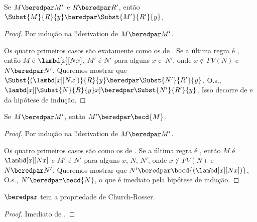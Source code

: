 \documentclass[../../../include/open-logic-section]{subfiles}
\begin{document}
\begin{lem}
  Se $M \beredpar M'$ e $R \beredpar R'$, então $\Subst{M}{R}{y}
  \beredpar \Subst{M'}{R'}{y}$.
\end{lem}

\begin{proof}
  Por indução na !!{derivation} de $M \beredpar M'$.

  Os quatro primeiros casos são exatamente como os de
  . Se a última regra é , então
  $M$ é $\lambd[x][Nx]$, $M'$ é $N'$ para alguns $x$ e~$N'$, onde
  $x \notin FV(N)$ e $N \beredpar N'$. Queremos mostrar que
  $\Subst{(\lambd[x][Nx])}{R}{y} \beredpar \Subst{N'}{R'}{y}$, O.s.\@,
  $\lambd[x][\Subst{N}{R}{y} x] \beredpar \Subst{N'}{R'}{y}$. Isso decorre
  de  e da hipótese de indução.
\end{proof}

\begin{lem}
  Se $M \beredpar M'$, então $M' \beredpar \becd{M}$.
\end{lem}

\begin{proof}
  Por indução na !!{derivation} de $M \beredpar M'$.

  Os quatro primeiros casos são como os de . Se a
  última regra é , então $M$ é $\lambd[x][Nx]$ e $M'$
  é $N'$ para alguns $x$, $N$, $N'$, onde $x \notin FV(N)$ e
  $N \beredpar N'$. Queremos mostrar que $N' \beredpar
  \becd{(\lambd[x][Nx])}$, O.s.\@, $N' \beredpar \becd{N}$, o que é
  imediato pela hipótese de indução.
\end{proof}

\begin{thm}
  $\beredpar$ tem a propriedade de Church-Rosser.
\end{thm}

\begin{proof}
  Imediato de .
\end{proof}
\end{document}
